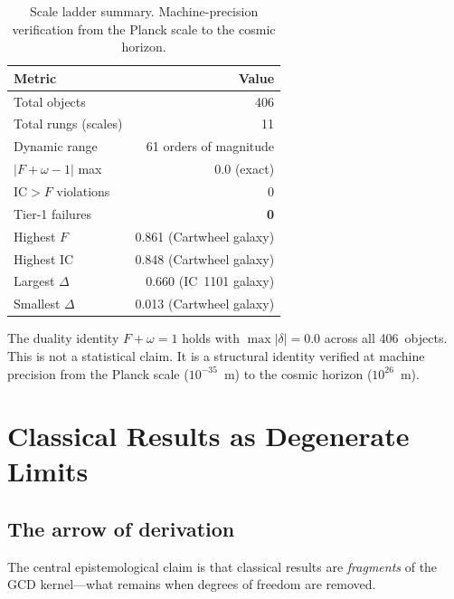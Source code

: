 \documentclass[
  aps,
  prd,
  twocolumn,
  superscriptaddress,
  nofootinbib,
  floatfix
]{revtex4-2}
\newcommand{\IC}{\mathrm{IC}}
\begin{document}
\begin{table}[t]
\caption{\label{tab:scale-ladder}Scale ladder summary.
Machine-precision verification from the Planck scale to the cosmic
horizon.}
\begin{ruledtabular}
\begin{tabular}{lr}
Metric & Value \\
\midrule
Total objects & 406 \\
Total rungs (scales) & 11 \\
Dynamic range & 61 orders of magnitude \\
$|F + \omega - 1|$ max & $0.0$ (exact) \\
$\IC > F$ violations & 0 \\
Tier-1 failures & \textbf{0} \\
Highest $F$ & 0.861 (Cartwheel galaxy) \\
Highest $\IC$ & 0.848 (Cartwheel galaxy) \\
Largest $\Delta$ & 0.660 (IC~1101 galaxy) \\
Smallest $\Delta$ & 0.013 (Cartwheel galaxy) \\
\end{tabular}
\end{ruledtabular}
\end{table}

The duality identity $F + \omega = 1$ holds with
$\max|\delta| = 0.0$ across all 406~objects.  This is not a
statistical claim.  It is a structural identity verified at machine
precision from the Planck scale ($10^{-35}$~m) to the cosmic horizon
($10^{26}$~m).

\section{Classical Results as Degenerate Limits}
\label{sec:degenerate}

\subsection{The arrow of derivation}

The central epistemological claim is that classical results are
\emph{fragments} of the GCD kernel---what remains when degrees of
freedom are removed.
\end{document}
